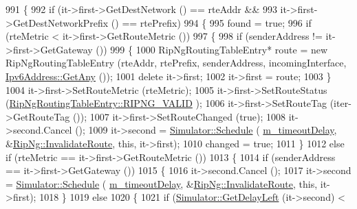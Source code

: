 \begin{DoxyCode}
991         \{
992           \textcolor{keywordflow}{if} (it->first->GetDestNetwork () == rteAddr &&
993               it->first->GetDestNetworkPrefix () == rtePrefix)
994             \{
995               found = \textcolor{keyword}{true};
996               \textcolor{keywordflow}{if} (rteMetric < it->first->GetRouteMetric ())
997                 \{
998                   \textcolor{keywordflow}{if} (senderAddress != it->first->GetGateway ())
999                     \{
1000                       RipNgRoutingTableEntry* route = \textcolor{keyword}{new} RipNgRoutingTableEntry (rteAddr, rtePrefix, 
      senderAddress, incomingInterface, \hyperlink{classns3_1_1Ipv6Address_a2783e8badfc98c8b0a8508bba6e1b91e}{Ipv6Address::GetAny} ());
1001                       \textcolor{keyword}{delete} it->first;
1002                       it->first = route;
1003                     \}
1004                   it->first->SetRouteMetric (rteMetric);
1005                   it->first->SetRouteStatus (\hyperlink{classns3_1_1RipNgRoutingTableEntry_af723fc23e97afdd05c55da5162b7e673a334e33ca88fb2b8de53c814814d3c017}{RipNgRoutingTableEntry::RIPNG\_VALID}
      );
1006                   it->first->SetRouteTag (iter->GetRouteTag ());
1007                   it->first->SetRouteChanged (\textcolor{keyword}{true});
1008                   it->second.Cancel ();
1009                   it->second = \hyperlink{classns3_1_1Simulator_a671882c894a08af4a5e91181bf1eec13}{Simulator::Schedule} (
      \hyperlink{classns3_1_1RipNg_aed45845b278332b589e76304a3701d72}{m\_timeoutDelay}, &\hyperlink{classns3_1_1RipNg_ae4fc1ca9ed948f3c028fd96fb016f7dd}{RipNg::InvalidateRoute}, \textcolor{keyword}{this}, it->first);
1010                   changed = \textcolor{keyword}{true};
1011                 \}
1012               \textcolor{keywordflow}{else} \textcolor{keywordflow}{if} (rteMetric == it->first->GetRouteMetric ())
1013                 \{
1014                   \textcolor{keywordflow}{if} (senderAddress == it->first->GetGateway ())
1015                     \{
1016                       it->second.Cancel ();
1017                       it->second = \hyperlink{classns3_1_1Simulator_a671882c894a08af4a5e91181bf1eec13}{Simulator::Schedule} (
      \hyperlink{classns3_1_1RipNg_aed45845b278332b589e76304a3701d72}{m\_timeoutDelay}, &\hyperlink{classns3_1_1RipNg_ae4fc1ca9ed948f3c028fd96fb016f7dd}{RipNg::InvalidateRoute}, \textcolor{keyword}{this}, it->first);
1018                     \}
1019                   \textcolor{keywordflow}{else}
1020                     \{
1021                       \textcolor{keywordflow}{if} (\hyperlink{classns3_1_1Simulator_af2c7b4285454aa5062bd2df2bb7a7ab9}{Simulator::GetDelayLeft} (it->second) < 

\end{DoxyCode}
